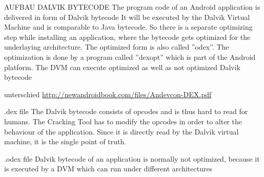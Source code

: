 AUFBAU DALVIK BYTECODE\newline
The program code of an Android application is delivered in form of Dalvik bytecode\newline
It will be executed by the Dalvik Virtual Machine and is comparable to Java bytecode. So there is a separate
optimizing step while installing an application, where the bytecode gets optimized for the underlaying architecture. The optimized form is also called ”odex”. The optimization is done by a program called ”dexopt” which is part of the Android platform. The DVM can execute optimized as well as not optimized Dalvik bytecode\newline

unterschied \url{http://newandroidbook.com/files/Andevcon-DEX.pdf}\newline

.dex file
The Dalvik bytecode consists of opcodes and is thus hard to read for humans. The Cracking Tool has to modify the opcodes in order to alter the behaviour of the application. Since it is directly read by the Dalvik virtual machine, it is the single point of truth.\newline

.odex file
Dalvik bytecode of an application is normally not optimized, because it is executed by a DVM which can run under different architectures\newline
